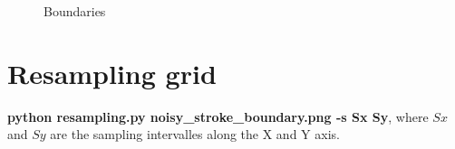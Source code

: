 \begin{figure}[!htb]\centering
    \begin{minipage}{0.7\textwidth}
        \caption{\small{Boundaries}}
    \end{minipage}
\end{figure}


\pagebreak

\section{Resampling grid}

\textbf{python resampling.py noisy\_stroke\_boundary.png -s Sx Sy}, where $Sx$ and $Sy$ are the sampling intervalles along the X and Y axis.

